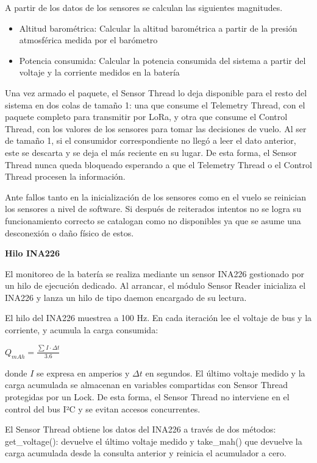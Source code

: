 \documentclass[12pt,a4paper]{article}
\begin{document}
A partir de los datos de los sensores se calculan las siguientes magnitudes.

\begin{itemize}
\item
  Altitud barométrica: Calcular la altitud barométrica a partir de la presión atmosférica medida por el barómetro
\item
  Potencia consumida: Calcular la potencia consumida del sistema a partir del voltaje y la corriente medidos en la batería
\end{itemize}

Una vez armado el paquete, el Sensor Thread lo deja disponible para el resto del sistema en dos colas de tamaño 1: una que consume el Telemetry Thread, con el paquete completo para transmitir por LoRa, y otra que consume el Control Thread, con los valores de los sensores para tomar las decisiones de vuelo. Al ser de tamaño 1, si el consumidor correspondiente no llegó a leer el dato anterior, este se descarta y se deja el más reciente en su lugar. De esta forma, el Sensor Thread nunca queda bloqueado esperando a que el Telemetry Thread o el Control Thread procesen la información.

Ante fallos tanto en la inicialización de los sensores como en el vuelo se reinician los sensores a nivel de software. Si después de reiterados intentos no se logra su funcionamiento correcto se catalogan como no disponibles ya que se asume una desconexión o daño físico de estos.

\textbf{Hilo INA226}

El monitoreo de la batería se realiza mediante un sensor INA226 gestionado por un hilo de ejecución dedicado. Al arrancar, el módulo Sensor Reader inicializa el INA226 y lanza un hilo de tipo daemon encargado de su lectura.

El hilo del INA226 muestrea a 100 Hz. En cada iteración lee el voltaje de bus y la corriente, y acumula la carga consumida:

\(Q_{mAh} = \frac{\sum_{}^{}I \cdot \Delta t}{3.6}\)

donde \(I\) se expresa en amperios y \(\Delta t\) en segundos. El último voltaje medido y la carga acumulada se almacenan en variables compartidas con Sensor Thread protegidas por un Lock. De esta forma, el Sensor Thread no interviene en el control del bus I²C y se evitan accesos concurrentes.

El Sensor Thread obtiene los datos del INA226 a través de dos métodos: get\_voltage(): devuelve el último voltaje medido y take\_mah() que devuelve la carga acumulada desde la consulta anterior y reinicia el acumulador a cero.
\end{document}
